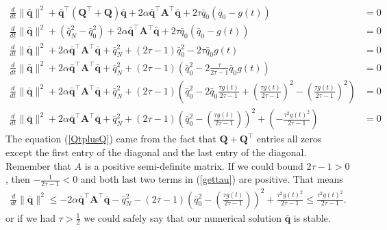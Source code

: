 \documentclass{article}
\theoremstyle{definition}
\begin{document}
    \begin{align}
        \frac{d}{dt} \| \bar{\mathbf{q}}  \|^2 
                + \bar{\mathbf{q}}^\top (\mathbf{Q}^\top  + \mathbf{Q}) \bar{\mathbf{q}} 
                + 2\alpha \bar{\mathbf{q}}^\top \mathbf{A}^\top \bar{\mathbf{q}} + 2\tau \bar{{q}}_0(\bar{{q}}_0 - g(t)) &=0 \\
        \frac{d}{dt} \| \bar{\mathbf{q}}  \|^2 + (\bar{{q}}_N^2 - \bar{{q}}_0^2) + 2\alpha \bar{\mathbf{q}}^\top \mathbf{A}^\top \bar{\mathbf{q}} + 2\tau \bar{{q}}_0(\bar{{q}}_0 - g(t)) &=0 \label{QtplusQ} \\ 
        \frac{d}{dt} \| \bar{\mathbf{q}}  \|^2 + 2\alpha \bar{\mathbf{q}}^\top \mathbf{A}^\top \bar{\mathbf{q}} 
            + \bar{{q}}_N^2 + (2\tau -1) \bar{{q}}_0^2 - 2\tau \bar{{q}}_0 g(t) &=0 \\
        \frac{d}{dt} \| \bar{\mathbf{q}}  \|^2 + 2\alpha \bar{\mathbf{q}}^\top \mathbf{A}^\top \bar{\mathbf{q}} + \bar{{q}}_N^2 
            + (2\tau -1)\left( \bar{{q}}_0^2 - 2\frac{\tau}{2\tau -1} \bar{{q}}_0 g(t) \right) &=0 \\
            \frac{d}{dt} \| \bar{\mathbf{q}}  \|^2 + 2\alpha \bar{\mathbf{q}}^\top \mathbf{A}^\top \bar{\mathbf{q}} + \bar{{q}}_N^2 
            + (2\tau -1)\left( \bar{{q}}_0^2 - 2\bar{{q}}_0 \frac{\tau g(t)}{2\tau -1} + \left(\frac{\tau g(t)}{2\tau -1}\right)^2  
                - \left(\frac{\tau g(t)}{2\tau -1}\right)^2 \right)&=0 \\
            \frac{d}{dt} \| \bar{\mathbf{q}}  \|^2 + 2\alpha \bar{\mathbf{q}}^\top \mathbf{A}^\top \bar{\mathbf{q}} + \bar{{q}}_N^2 
                + (2\tau -1)\left( \bar{{q}}_0^2 -  \left(\frac{\tau g(t)}{2\tau -1}\right) \right)^2 
                    + \left(- \frac{\tau^2 g(t)^2}{2\tau -1} \right) &=0 \label{gettau}
        \end{align}
    The equation (\ref{QtplusQ}) came from the fact that $\mathbf{Q}+\mathbf{Q}^\top $ entries all zeros except the first entry
    of the diagonal and the last entry of the diagonal. Remember that $A$ is a positive semi-definite matrix. 
    If we could bound $2\tau -1 >0$, then $-\frac{1}{2\tau -1}<0$ and both last two terms in (\ref{gettau}) are positive. 
    That means 
    \begin{align}
        \frac{d}{dt} \| \bar{\mathbf{q}}  \|^2 \leq - 2\alpha \bar{\mathbf{q}}^\top \mathbf{A}^\top \bar{\mathbf{q}} - \bar{{q}}_N^2  
            - (2\tau -1)\left( \bar{{q}}_0^2 -  \left(\frac{\tau g(t)}{2\tau -1}\right) \right)^2 
                + \frac{\tau^2 g(t)^2}{2\tau -1} \leq  \frac{\tau^2 g(t)^2}{2\tau -1}. 
    \end{align}
    or if we had $\tau > \frac{1}{2}$ we could safely say that our numerical solution $\bar{\mathbf{q}}$ is stable.
\end{document}
